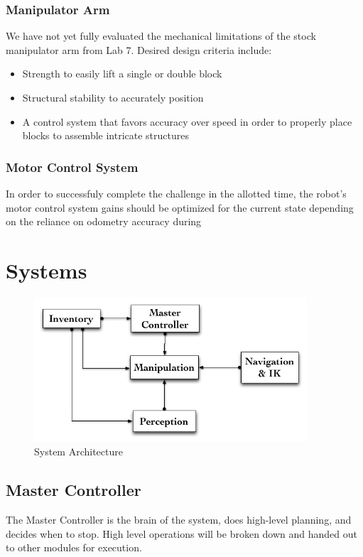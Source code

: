 \documentclass[letterpaper,11pt]{article}
\begin{document}
\subsubsection{Manipulator Arm}
We have not yet fully evaluated the mechanical limitations of the stock manipulator arm from Lab 7. Desired design criteria include:
\begin{itemize}
\item Strength to easily lift a single or double block
\item Structural stability to accurately position
\item A control system that favors accuracy over speed in order to properly place blocks to assemble intricate structures
\end{itemize}
\subsubsection {Motor Control System}
In order to successfuly complete the challenge in the allotted time, the robot's motor control system gains should be optimized for the current state depending on the reliance on  odometry accuracy during
\section{Systems}
\begin{figure}[h]
\centering
 \includegraphics[width=4in]{images/System_Architecture}
\caption{System Architecture}
\end{figure}

\subsection{Master Controller}
The Master Controller is the brain of the system, does high-level planning, and decides when to stop.
High level operations will be broken down and handed out to other modules for execution.
\end{document}
